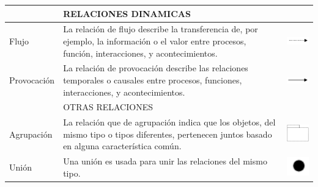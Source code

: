 \begin{table}[H]
\begin{tabular}{| m{4cm} | m{4cm} | m{4cm} | }
		\hline
		&\centering\vspace{1.52mm}RELACIONES DINAMICAS & \\
		\hline
		\centering\vspace{1.52mm}Flujo & \vspace{1.52mm}La relación de flujo describe la transferencia de, por ejemplo, la información o el valor entre procesos, función, interacciones, y acontecimientos.& \vspace{1.52mm}\includegraphics[width=30mm]{arquitectura/imagenes/48} \\
		\hline
		\centering\vspace{1.52mm}Provocación& \vspace{1.52mm}La relación de provocación describe las relaciones temporales o causales entre procesos, funciones, interacciones, y acontecimientos.& \vspace{1.52mm}\includegraphics[width=30mm]{arquitectura/imagenes/49} \\
		\hline
		&\centering\vspace{1.52mm}OTRAS RELACIONES & \\
		\hline
		\centering\vspace{1.52mm}Agrupación& \vspace{1.52mm}La relación que de agrupación indica que los objetos, del mismo tipo o tipos diferentes, pertenecen juntos basado en alguna característica común.& \vspace{1.52mm}\includegraphics[width=20mm]{arquitectura/imagenes/410} \\
		\hline
		\centering\vspace{1.52mm}Unión& \vspace{1.52mm}Una unión es usada para unir las relaciones del mismo tipo.& \vspace{1.52mm}\includegraphics[width=20mm]{arquitectura/imagenes/411} \\

\end{tabular}
\end{table}
